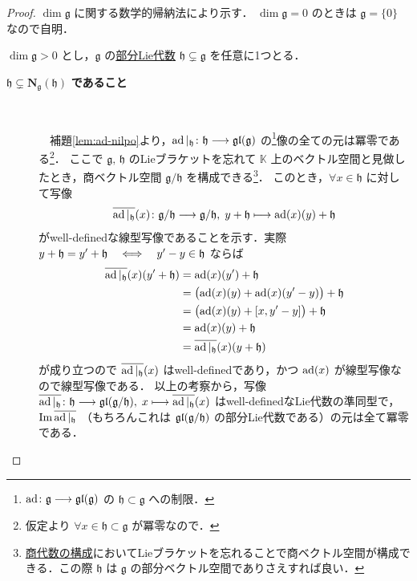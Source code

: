 \documentclass[rep_main]{subfiles}
\begin{document}
\begin{proof}
    $\dim \mathfrak{g}$ に関する数学的帰納法により示す．
    $\dim \mathfrak{g} = 0$ のときは $\mathfrak{g} = \{0\}$ なので自明．

    $\dim \mathfrak{g} > 0$ とし，$\mathfrak{g}$ の\hyperref[def:subLieAlg]{部分Lie代数} $\mathfrak{h} \subsetneq \mathfrak{g}$ を任意に1つとる．
    
    \begin{description}
        \item[$\bm{\mathfrak{h} \subsetneq N_{\mathfrak{g}} (\mathfrak{h})}$ \textbf{であること}]　
        
            　補題\ref{lem:ad-nilpo}より，$\operatorname{ad}|_{\mathfrak{h}} \colon \mathfrak{h} \longrightarrow \mathfrak{gl}(\mathfrak{g})$ の\footnote{$\operatorname{ad} \colon \mathfrak{g} \longrightarrow \mathfrak{gl} (\mathfrak{g})$ の $\mathfrak{h} \subset \mathfrak{g}$ への制限．}像の全ての元は冪零である\footnote{仮定より $\forall x \in \mathfrak{h} \subset \mathfrak{g}$ が冪零なので．}．
            ここで $\mathfrak{g},\, \mathfrak{h}$ のLieブラケットを忘れて $\mathbb{K}$ 上のベクトル空間と見做したとき，商ベクトル空間 $\mathfrak{g} / \mathfrak{h}$ を構成できる\footnote{\hyperref[def:quotient-LieAlg]{商代数の構成}においてLieブラケットを忘れることで商ベクトル空間が構成できる．この際 $\mathfrak{h}$ は $\mathfrak{g}$ の部分ベクトル空間でありさえすれば良い．}．
            このとき，$\forall x \in \mathfrak{h}$ に対して写像
            \begin{align}
                \overline{\operatorname{ad}|_{\mathfrak{h}}}(x) \colon \mathfrak{g} / \mathfrak{h} \longrightarrow \mathfrak{g} / \mathfrak{h},\; y + \mathfrak{h} \longmapsto \operatorname{ad} (x) (y) + \mathfrak{h}
            \end{align}
            がwell-definedな線型写像であることを示す．実際 $y + \mathfrak{h} = y' + \mathfrak{h} \quad \Longleftrightarrow \quad y' - y \in \mathfrak{h}$ ならば
            \begin{align}
                \overline{\ad|_{\mathfrak{h}}}(x) (y' + \mathfrak{h}) &= \ad (x) (y')  + \mathfrak{h} \\
                &= \bigl(\ad (x) (y) + \ad (x) (y' - y)\bigr) + \mathfrak{h} \\
                &= \bigl(\ad (x) (y) + \comm{x}{y' - y}\bigr) + \mathfrak{h} \\
                &= \ad (x) (y) + \mathfrak{h} \\
                &= \overline{\ad|_{\mathfrak{h}}}(x) (y + \mathfrak{h})
            \end{align}
            が成り立つので $\overline{\operatorname{ad}|_{\mathfrak{h}}}(x)$ はwell-definedであり，かつ $\operatorname{ad} (x)$ が線型写像なので線型写像である．
            以上の考察から，写像 $\overline{\operatorname{ad}|_{\mathfrak{h}}} \colon \mathfrak{h} \longrightarrow \mathfrak{gl} (\mathfrak{g} / \mathfrak{h}),\; x \longmapsto \overline{\operatorname{ad}|_{\mathfrak{h}}} (x)$ はwell-definedなLie代数の準同型で，$\Im \overline{\operatorname{ad}|_{\mathfrak{h}}}$ （もちろんこれは $\mathfrak{gl} (\mathfrak{g}/\mathfrak{h})$ の部分Lie代数である）の元は全て冪零である．


\end{description}
\end{proof}
\end{document}
